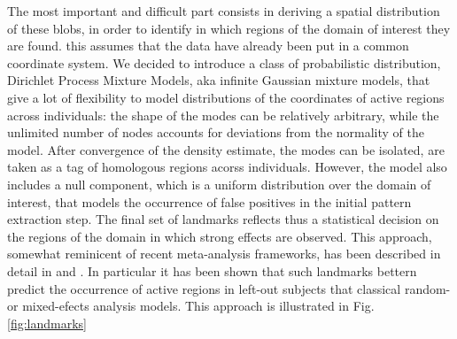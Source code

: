 \documentclass{bioinfo}
\begin{document}
The most important and difficult part consists in deriving a spatial
distribution of these blobs, in order to identify in which regions of
the domain of interest they are found.
%
this assumes that the data have already been put in a common coordinate
system.
%
We decided to introduce a class of probabilistic distribution,
Dirichlet Process Mixture Models, aka infinite Gaussian mixture
models, that give a lot of flexibility to model distributions of the
coordinates of active regions across individuals: the shape of the
modes can be relatively arbitrary, while the unlimited number of nodes
accounts for deviations from the normality of the model.
%
After convergence of the density estimate, the modes can be isolated,
are taken as a tag of homologous regions acorss individuals.
%
However, the model also includes a null component, which is a uniform
distribution over the domain of interest, that models the occurrence of
false positives in the initial pattern extraction step.
%
The final set of landmarks reflects thus a statistical decision on
the regions of the domain in which strong effects are observed.
%
This approach, somewhat reminicent of recent meta-analysis frameworks,
has been described in detail in \cite{Thirion2007} and
\cite{Thirion2010}.
%
In particular it has been shown that such landmarks bettern predict
the occurrence of active regions in left-out subjects that classical
random- or mixed-efects analysis models.
%
This approach is illustrated in Fig. \ref{fig:landmarks} 
\end{document}
